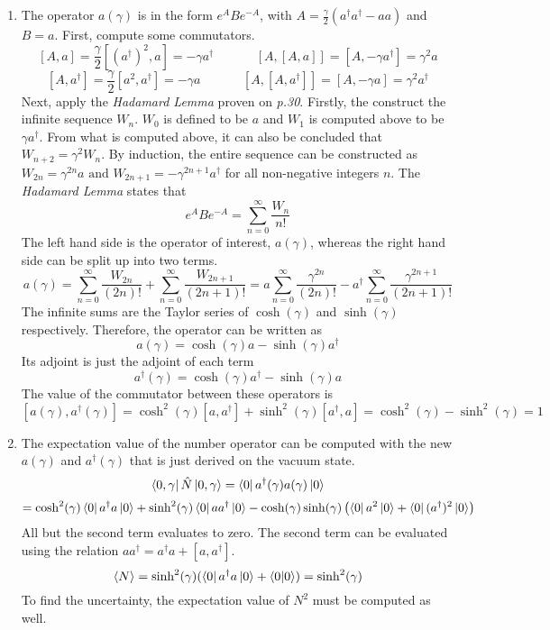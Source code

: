 \begin{sol}
\begin{enumerate}[label=\textbf{(\alph*)}]
\item
The operator $a(\gamma)$ is in the form $e^ABe^{-A}$, with $A=\frac{\gamma}{2}(a^\dagger a^\dagger-aa)$ and $B=a$. First, compute some commutators.
$$[A,a]=\frac{\gamma}{2}[(a^\dagger)^2,a]=-\gamma a^\dagger\:\:\:\:\:\:\:\:\:\:\:\:\:\:\:[A,[A,a]]=[A,-\gamma a^\dagger]=\gamma^2a$$ 
$$[A, a^\dagger]=\frac{\gamma}{2}[a^2, a^\dagger]=-\gamma a\:\:\:\:\:\:\:\:\:\:\:\:\:\:\:[A,[A,a^\dagger]]=[A,-\gamma a]=\gamma^2a^\dagger$$ 
Next, apply the \textit{Hadamard Lemma} proven on \textit{p.30}. Firstly, the construct the infinite sequence $W_n$. $W_0$ is defined to be $a$ and $W_1$ is computed above to be $\gamma a^\dagger$. From what is computed above, it can also be concluded that $W_{n+2}=\gamma^2W_n$. By induction, the entire sequence can be constructed as $W_{2n}=\gamma^{2n}a\text{  and  }W_{2n+1}=-\gamma^{2n+1}a^\dagger$ for all non-negative integers $n$. The \textit{Hadamard Lemma} states that 
$$e^ABe^{-A}=\sum_{n=0}^\infty\frac{W_n}{n!}$$ 
The left hand side is the operator of interest, $a(\gamma)$, whereas the right hand side can be split up into two terms.
$$a(\gamma)=\sum_{n=0}^\infty\frac{W_{2n}}{(2n)!}+\sum_{n=0}^\infty\frac{W_{2n+1}}{(2n+1)!}=a\sum_{n=0}^\infty\frac{\gamma^{2n}}{(2n)!}-a^\dagger\sum_{n=0}^\infty\frac{\gamma^{2n+1}}{(2n+1)!}$$ 
The infinite sums are the Taylor series of $\cosh(\gamma)$ and $\sinh(\gamma)$ respectively. Therefore, the operator can be written as
$$a(\gamma)=\cosh(\gamma)a-\sinh(\gamma)a^\dagger$$ 
Its adjoint is just the adjoint of each term
$$a^\dagger(\gamma)=\cosh(\gamma)a^\dagger-\sinh(\gamma)a$$
The value of the commutator between these operators is
$$[a(\gamma),a^\dagger(\gamma)]=\cosh^2(\gamma)[a,a^\dagger]+\sinh^2(\gamma)[a^\dagger,a]=\cosh^2(\gamma)-\sinh^2(\gamma)=1$$
\item
The expectation value of the number operator can be computed with the new $a(\gamma)$ and $a^\dagger(\gamma)$ that is just derived on the vacuum state.
$$\bra{0,\gamma}\hat N\ket{0,\gamma}=\bra0 a^\dagger(\gamma)a(\gamma)\ket0$$
$$=\cosh^2(\gamma)\bra0 a^\dagger a\ket0+\sinh^2(\gamma)\bra0 aa^\dagger\ket0-\cosh(\gamma)\sinh(\gamma)\left(\bra0 a^2\ket0+\bra0 (a^\dagger)^2\ket0\right)$$   
All but the second term evaluates to zero. The second term can be evaluated using the relation $aa^\dagger=a^\dagger a+[a,a^\dagger]$.
$$\langle N\rangle = \sinh^2(\gamma)(\bra0a^\dagger a\ket0+\braket{0}{0})=\sinh^2(\gamma)$$
To find the uncertainty, the expectation value of $N^2$ must be computed as well.

\end{enumerate}
\end{sol}
